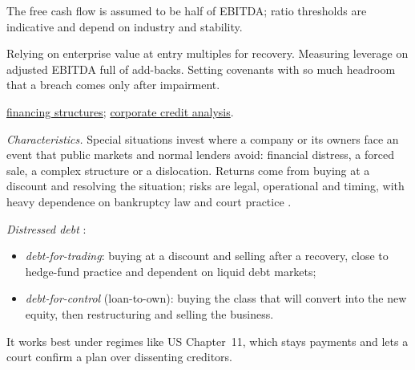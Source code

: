 \begin{qfmethod}
 The free cash flow is assumed to be half of EBITDA; ratio thresholds are indicative and depend on industry and stability.

 Relying on enterprise value at entry multiples for recovery. Measuring leverage on adjusted EBITDA full of add-backs. Setting covenants with so much headroom that a breach comes only after impairment.

 \hyperref[meth:private-debt-financing-structures]{financing structures}; \hyperref[meth:corporate-credit-analysis]{corporate credit analysis}.

\end{qfmethod}

\begin{qfmethod}\label{meth:special-situations-distressed}
 \emph{Characteristics.} Special situations invest where a company or its owners face an event that public markets and normal lenders avoid: financial distress, a forced sale, a complex structure or a dislocation. Returns come from buying at a discount and resolving the situation; risks are legal, operational and timing, with heavy dependence on bankruptcy law and court practice \citep[pp.~126--128]{demaria-private-markets-2021}.

\emph{Distressed debt} \citep[pp.~127--130]{demaria-private-markets-2021}:
\begin{itemize}
\item \emph{debt-for-trading}: buying at a discount and selling after a recovery, close to hedge-fund practice and dependent on liquid debt markets;
\item \emph{debt-for-control} (loan-to-own): buying the class that will convert into the new equity, then restructuring and selling the business.
\end{itemize}
It works best under regimes like US Chapter~11, which stays payments and lets a court confirm a plan over dissenting creditors.


\end{qfmethod}
